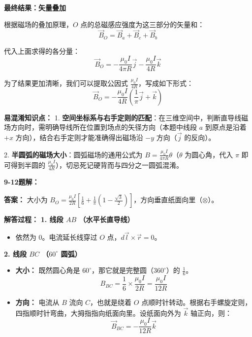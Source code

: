 \textbf{最终结果：矢量叠加}

根据磁场的叠加原理，$O$ 点的总磁感应强度为这三部分的矢量和：
\begin{equation}\label{eq:9-10-6}
	\vec{B}_O = \vec{B}_a + \vec{B}_c + \vec{B}_b
\end{equation}

代入上面求得的各分量：
\begin{equation}\label{eq:9-10-7}
	\vec{B}_O = -\frac{\mu_0 I}{4\pi R}\vec{j} - \frac{\mu_0 I}{4R}\vec{k}
\end{equation}

为了结果更加清晰，我们可以提取公因式 $\frac{\mu_0 I}{4R}$，写成如下形式：
\begin{equation}\label{eq:9-10-8}
	\vec{B}_O = -\frac{\mu_0 I}{4R} \left( \frac{1}{\pi}\vec{j} + \vec{k} \right)
\end{equation}

\textbf{易混淆知识点： }
1. \textbf{空间坐标系与右手定则的匹配}：在三维空间中，判断直导线磁场方向时，需明确导线所在位置到场点的矢径方向（本题中线段 $a$ 到原点是沿着 $+x$ 方向），结合右手定则才能准确得出磁场沿 $-y$ 方向（$\vec{j}$ 的反向）。

2. \textbf{半圆弧的磁场大小}：圆弧磁场的通用公式为 $B = \frac{\mu_0 I}{4\pi R} \theta$（$\theta$ 为圆心角，代入 $\pi$ 即可得到半圆的 $\frac{\mu_0 I}{4R}$），切忌死记硬背而与四分之一圆弧混淆。

\vspace{1em}

\textbf{9-12题解： }
\setcounter{equation}{0}
\renewcommand{\theHequation}{9-12.\arabic{equation}}

\textbf{答案： }
大小为 $B_O = \frac{\mu_0 I}{2R} \left[ \frac{1}{6} + \frac{1}{\pi} \left( 1 - \frac{\sqrt{3}}{2} \right) \right]$，方向垂直纸面向里（$\otimes$）。

\textbf{解答过程： }
\textbf{1. 线段 $AB$ （水平长直导线）}
\begin{itemize}
	\item 依然为 0。电流延长线穿过 $O$ 点，$d\vec{l} \times \vec{r} = 0$。
\end{itemize}

\textbf{2. 线段 $BC$ （$60^\circ$ 圆弧）}
\begin{itemize}
	\item \textbf{大小：} 既然圆心角是 $60^\circ$，那它就是完整圆（$360^\circ$）的 $\frac{1}{6}$。
	\begin{equation}\label{eq:9-12-1}
		B_{BC} = \frac{1}{6} \times \frac{\mu_0 I}{2R} = \frac{\mu_0 I}{12R}
	\end{equation}
	\item \textbf{方向：} 电流从 $B$ 流向 $C$，也就是绕着 $O$ 点顺时针转动。根据右手螺旋定则，四指顺时针弯曲，大拇指指向纸面向里。设纸面向外为 $\vec{k}$ 轴正向，则：
	\begin{equation}\label{eq:9-12-2}
		\vec{B}_{BC} = -\frac{\mu_0 I}{12R}\vec{k}
	\end{equation}
\end{itemize}

